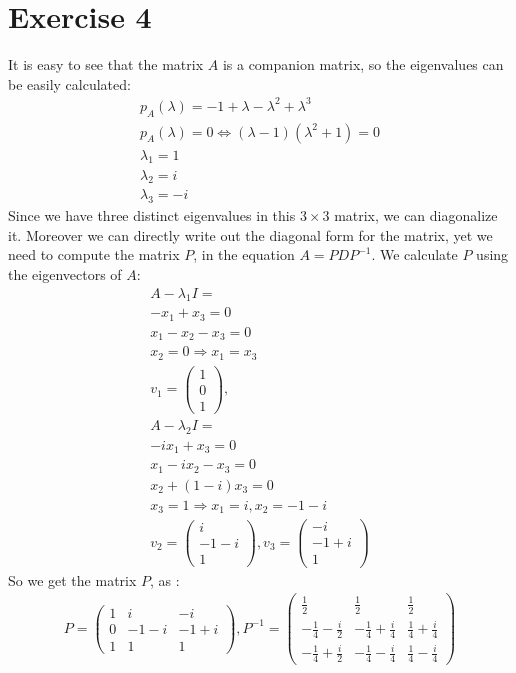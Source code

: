\section{Exercise 4}
It is easy to see that the matrix $A$ is a companion matrix, so the eigenvalues can be easily calculated:
\begin{gather*}
p_A(\lambda) = -1 + \lambda - \lambda^2 + \lambda^3 \\
p_A(\lambda) = 0 \Leftrightarrow \left( \lambda -1 \right)\left( \lambda^2 +1 \right) = 0\\
\lambda_1 = 1\\
\lambda_2 = i\\
\lambda_3 = -i
\end{gather*}
Since we have three distinct eigenvalues in this $3 \times 3$ matrix, we can diagonalize it. Moreover we can directly write out the diagonal form for the matrix, yet we need to compute the matrix $P$, in the equation $A = PDP^{-1}$. We calculate $P$ using the eigenvectors of $A$:
\begin{gather*}
A-\lambda_1 I =\\
-x_1 +x_3 = 0\\
x_1 -x_2 -x_3 = 0\\
x_2 = 0 \Rightarrow x_1 = x_3\\
v_1 = \left( \begin{array}{c}
1 \\
0 \\
1
\end{array} \right),\\
A-\lambda_2 I =\\
-ix_1 + x_3 = 0\\
x_1 - ix_2 - x_3 = 0\\
x_2 + (1-i) x_3 = 0\\
x_3 = 1 \Rightarrow x_1 = i, x_2 = -1-i\\
v_2 = \left( \begin{array}{c}
i \\
-1-i \\
1
\end{array} \right),
v_3 = \left( \begin{array}{c}
-i \\
-1+i \\
1
\end{array} \right)
\end{gather*}
So we get the matrix $P$, as :
\begin{gather*}
P = \left( \begin{array}{ccc}
1 & i & -i\\
0 & -1-i & -1+i \\
1 & 1 & 1
\end{array} \right), 
P^{-1} = \left( \begin{array}{ccc}
\frac{1}{2} &\frac{1}{2} &\frac{1}{2} \\
-\frac{1}{4}-\frac{i}{2} & -\frac{1}{4} + \frac{i}{4} & \frac{1}{4} + \frac{i}{4}\\
-\frac{1}{4}+\frac{i}{2} & -\frac{1}{4}-\frac{i}{4} & \frac{1}{4} - \frac{i}{4}
\end{array} \right)
\end{gather*}
